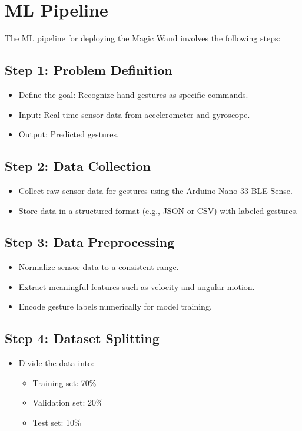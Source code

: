 \section{ML Pipeline}

The ML pipeline for deploying the Magic Wand involves the following steps:

\subsection{Step 1: Problem Definition}
\begin{itemize}
	\item Define the goal: Recognize hand gestures as specific commands.
	\item Input: Real-time sensor data from accelerometer and gyroscope.
	\item Output: Predicted gestures.
\end{itemize}

\subsection{Step 2: Data Collection}
\begin{itemize}
	\item Collect raw sensor data for gestures using the Arduino Nano 33 BLE Sense.
	\item Store data in a structured format (e.g., JSON or CSV) with labeled gestures.
\end{itemize}

\subsection{Step 3: Data Preprocessing}
\begin{itemize}
	\item Normalize sensor data to a consistent range.
	\item Extract meaningful features such as velocity and angular motion.
	\item Encode gesture labels numerically for model training.
\end{itemize}

\subsection{Step 4: Dataset Splitting}
\begin{itemize}
	\item Divide the data into:
	\begin{itemize}
		\item Training set: 70\%
		\item Validation set: 20\%
		\item Test set: 10\%
	\end{itemize}
\end{itemize}

